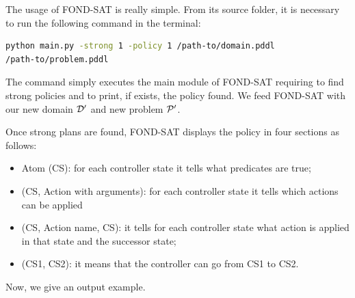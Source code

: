 The usage of FOND-SAT is really simple. From its source folder, it is necessary to run the following command in the terminal:
\begin{lstlisting}[language=bash]
python main.py -strong 1 -policy 1 /path-to/domain.pddl 
/path-to/problem.pddl
\end{lstlisting}
The command simply executes the main module of FOND-SAT requiring to find strong policies and to print, if exists, the policy found. We feed FOND-SAT with our new domain $\D'$ and new problem $\P'$.

Once strong plans are found, FOND-SAT displays the policy in four sections as follows:
\begin{itemize}
\item Atom (CS): for each controller state it tells what predicates are true;
\item (CS, Action with arguments): for each controller state it tells which actions can be applied
\item (CS, Action name, CS): it tells for each controller state what action is applied in that state and the successor state;
\item (CS1, CS2): it means that the controller can go from CS1 to CS2. 
\end{itemize}
Now, we give an output example.

